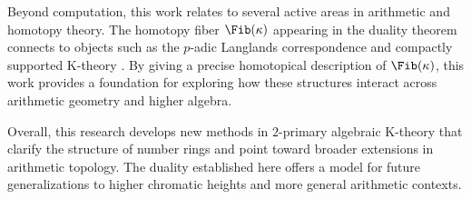 \documentclass[11pt]{article}
\begin{document}
Beyond computation, this work relates to several active areas in arithmetic and homotopy theory.
The homotopy fiber $\Fib(\kappa)$ appearing in the duality theorem connects to objects such as the $p$-adic Langlands correspondence \cite{MR2905536} and compactly supported K-theory \cite{MR3211458}.
By giving a precise homotopical description of $\Fib(\kappa)$, this work provides a foundation for exploring how these structures interact across arithmetic geometry and higher algebra.

Overall, this research develops new methods in $2$-primary algebraic K-theory that clarify the structure of number rings and point toward broader extensions in arithmetic topology.
The duality established here offers a model for future generalizations to higher chromatic heights and more general arithmetic contexts.
\end{document}
